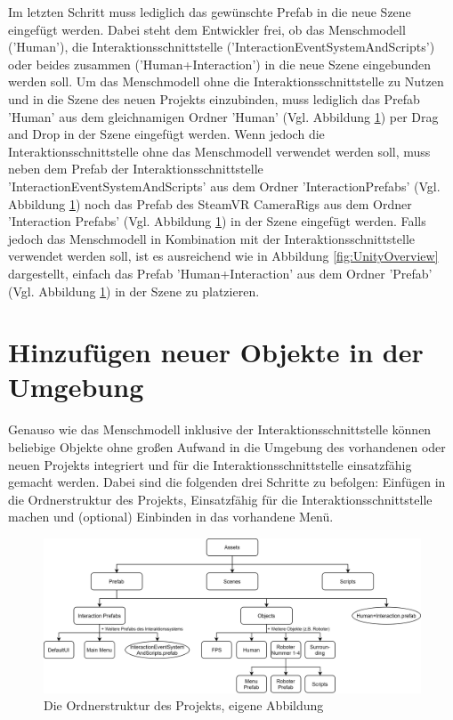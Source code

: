 \begin{enumerate}
	Im letzten Schritt muss lediglich das gewünschte Prefab in die neue Szene eingefügt werden. Dabei steht dem Entwickler frei, ob das Menschmodell ('Human'), die Interaktionsschnittstelle ('InteractionEventSystemAndScripts') oder beides zusammen ('Human+Interaction') in die neue Szene eingebunden werden soll. Um das Menschmodell ohne die Interaktionsschnittstelle zu Nutzen und in die Szene des neuen Projekts einzubinden, muss lediglich das Prefab 'Human' aus dem gleichnamigen Ordner 'Human' (Vgl. Abbildung \ref{fig:Ordnerstruktur}) per Drag and Drop in der Szene eingefügt werden. Wenn jedoch die Interaktionsschnittstelle ohne das Menschmodell verwendet werden soll, muss neben dem Prefab der Interaktionsschnittstelle 'InteractionEventSystemAndScripts' aus dem Ordner 'InteractionPrefabs' (Vgl. Abbildung \ref{fig:Ordnerstruktur}) noch das Prefab des SteamVR CameraRigs aus dem Ordner 'Interaction Prefabs' (Vgl. Abbildung \ref{fig:Ordnerstruktur}) in der Szene eingefügt werden. Falls jedoch das Menschmodell in Kombination mit der Interaktionsschnittstelle verwendet werden soll, ist es ausreichend wie in Abbildung \ref{fig:UnityOverview} dargestellt, einfach das Prefab 'Human+Interaction' aus dem Ordner 'Prefab' (Vgl. Abbildung \ref{fig:Ordnerstruktur}) in der Szene zu platzieren.
\end{enumerate}

\section{Hinzufügen neuer Objekte in der Umgebung}\label{sec:ObjekteEinbinden}
Genauso wie das Menschmodell inklusive der Interaktionsschnittstelle können beliebige Objekte ohne großen Aufwand in die Umgebung des vorhandenen oder neuen Projekts integriert und für die Interaktionsschnittstelle einsatzfähig gemacht werden. Dabei sind die folgenden drei Schritte zu befolgen: Einfügen in die Ordnerstruktur des Projekts, Einsatzfähig für die Interaktionsschnittstelle machen und (optional) Einbinden in das vorhandene Menü.

\begin{figure}[h]
	\centering
	\includegraphics[width=1\linewidth]{Bilder/A54_Ordnerstruktur}
	\caption{Die Ordnerstruktur des Projekts, eigene Abbildung}
	\label{fig:Ordnerstruktur}
\end{figure}

